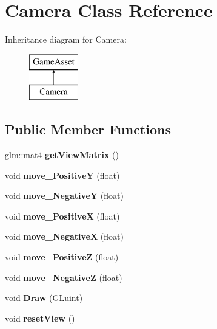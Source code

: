 \hypertarget{classCamera}{}\section{Camera Class Reference}
\label{classCamera}
Inheritance diagram for Camera\+:\begin{figure}[H]
\begin{center}
\leavevmode
\includegraphics[height=2.000000cm]{classCamera}
\end{center}
\end{figure}
\subsection*{Public Member Functions}
\begin{DoxyCompactItemize}
\item 
\mbox{\label{classCamera_a5569ca5967e01d3344fbf6aba36d9820}} 
glm\+::mat4 {\bfseries get\+View\+Matrix} ()
\item 
\mbox{\label{classCamera_ac147942fad5ba70bd9a7d3960258f0f5}} 
void {\bfseries move\+\_\+\+PositiveY} (float)
\item 
\mbox{\label{classCamera_a9d92e451804ad72d049bb8b2d373064d}} 
void {\bfseries move\+\_\+\+NegativeY} (float)
\item 
\mbox{\label{classCamera_a9075c40ce6f42f8e1ebbe82302537a5f}} 
void {\bfseries move\+\_\+\+PositiveX} (float)
\item 
\mbox{\label{classCamera_ac6580bfbbc54659b2985715a9da4d814}} 
void {\bfseries move\+\_\+\+NegativeX} (float)
\item 
\mbox{\label{classCamera_a7e459e7241931372794d4ec981c89d8b}} 
void {\bfseries move\+\_\+\+PositiveZ} (float)
\item 
\mbox{\label{classCamera_abbbd13815d534f0c49ff3b9831a1a6e0}} 
void {\bfseries move\+\_\+\+NegativeZ} (float)
\item 
\mbox{\label{classCamera_a81a437bea2feaf9754918480fb6b90e7}} 
void {\bfseries Draw} (G\+Luint)
\item 
\mbox{\label{classCamera_ad7e8f779ab27268fe301c3e4db4187a5}} 
void {\bfseries reset\+View} ()
\end{DoxyCompactItemize}
